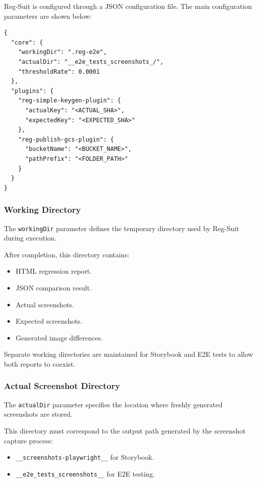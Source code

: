 Reg-Suit is configured through a JSON configuration file. The main configuration parameters are shown below:

\begin{lstlisting}[caption={Reg-Suit configuration}]
{
  "core": {
    "workingDir": ".reg-e2e",
    "actualDir": "__e2e_tests_screenshots_/",
    "thresholdRate": 0.0001
  },
  "plugins": {
    "reg-simple-keygen-plugin": {
      "actualKey": "<ACTUAL_SHA>",
      "expectedKey": "<EXPECTED_SHA>"
    },
    "reg-publish-gcs-plugin": {
      "bucketName": "<BUCKET_NAME>",
      "pathPrefix": "<FOLDER_PATH>"
    }
  }
}
\end{lstlisting}


\subsubsection{Working Directory}

The \texttt{workingDir} parameter defines the temporary directory used by Reg-Suit during execution.

After completion, this directory contains:

\begin{itemize}
    \item HTML regression report.
    \item JSON comparison result.
    \item Actual screenshots.
    \item Expected screenshots.
    \item Generated image differences.
\end{itemize}

Separate working directories are maintained for Storybook and E2E tests to allow both reports to coexist.


\subsubsection{Actual Screenshot Directory}

The \texttt{actualDir} parameter specifies the location where freshly generated screenshots are stored.

This directory must correspond to the output path generated by the screenshot capture process:

\begin{itemize}
    \item \texttt{\_\_screenshots-playwright\_\_} for Storybook.
    \item \texttt{\_\_e2e\_tests\_screenshots\_\_} for E2E testing.
\end{itemize}


